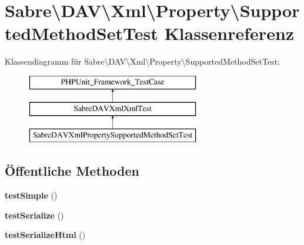 \hypertarget{class_sabre_1_1_d_a_v_1_1_xml_1_1_property_1_1_supported_method_set_test}{}\section{Sabre\textbackslash{}D\+AV\textbackslash{}Xml\textbackslash{}Property\textbackslash{}Supported\+Method\+Set\+Test Klassenreferenz}
\label{class_sabre_1_1_d_a_v_1_1_xml_1_1_property_1_1_supported_method_set_test}
Klassendiagramm für Sabre\textbackslash{}D\+AV\textbackslash{}Xml\textbackslash{}Property\textbackslash{}Supported\+Method\+Set\+Test\+:\begin{figure}[H]
\begin{center}
\leavevmode
\includegraphics[height=3.000000cm]{class_sabre_1_1_d_a_v_1_1_xml_1_1_property_1_1_supported_method_set_test}
\end{center}
\end{figure}
\subsection*{Öffentliche Methoden}
\begin{DoxyCompactItemize}
\item 
\mbox{\label{class_sabre_1_1_d_a_v_1_1_xml_1_1_property_1_1_supported_method_set_test_a74c550826227fd056f6c3b01348dca99}} 
{\bfseries test\+Simple} ()
\item 
\mbox{\label{class_sabre_1_1_d_a_v_1_1_xml_1_1_property_1_1_supported_method_set_test_a42ad235c68dc84afe39988860569c098}} 
{\bfseries test\+Serialize} ()
\item 
\mbox{\label{class_sabre_1_1_d_a_v_1_1_xml_1_1_property_1_1_supported_method_set_test_a2959a7dd7466684cddb0aa5b1aacab5f}} 
{\bfseries test\+Serialize\+Html} ()
\end{DoxyCompactItemize}
